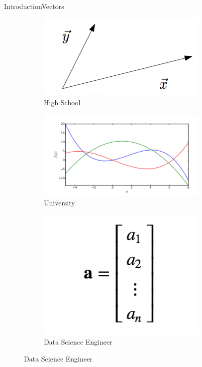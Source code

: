 \documentclass[10pt]{beamer}
\begin{document}
\begin{frame}{Introduction}{Vectors}
\begin{figure}[!htb]
\centering
\begin{subfigure}[t]{0.30\linewidth}
\includegraphics[width=0.90\textwidth]{Feathergraphics/school.png}
\caption{High School}
\end{subfigure}
\begin{subfigure}[t]{0.30\linewidth}
\includegraphics[width=0.90\textwidth]{Feathergraphics/univ.png}
\caption{University}
\end{subfigure}
\begin{subfigure}[t]{0.30\linewidth}
\includegraphics[width=0.90\textwidth]{Feathergraphics/eng.png}
\caption{Data Science Engineer}
\end{subfigure}

\vspace{0.1in}
\label{fig:tripEmb}
\end{figure}

\end{frame}
\end{document}
